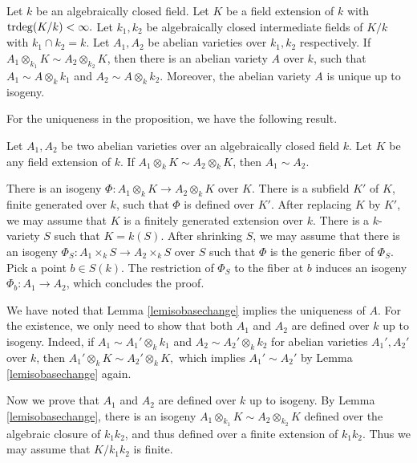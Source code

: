 \begin{pro}\label{lembasechangediagram}
Let $k$ be an algebraically closed field. Let $K$ be a field extension of $k$ with ${\mathrm{trdeg}}(K/k)<\infty.$
Let $k_1,k_2$ be algebraically closed intermediate fields of $K/k$ with $k_1\cap k_2=k.$
Let $A_1,A_2$ be abelian varieties over $k_1,k_2$ respectively.
 If $A_1\otimes_{k_1}K\sim A_2\otimes_{k_2}K$, then there is an abelian variety
$A$ over $k$, such that $A_1\sim A\otimes_{k}k_1$ and $A_2\sim A\otimes_{k}k_2.$
Moreover, the abelian variety $A$ is unique up to isogeny.
\end{pro}

For the uniqueness in the proposition, we have the following result.

\begin{lem}
\notready\label{lemisobasechange}
Let $A_1,A_2$ be two abelian varieties over an algebraically closed field $k$.  Let $K$ be any field extension of $k$. If $A_1\otimes_kK\sim A_2\otimes_kK$, then $A_1\sim A_2.$
\end{lem}

\proof
There is an isogeny  $\Phi: A_1\otimes_kK\to A_2\otimes_kK$ over $K.$ There is a subfield $K'$ of $K$, finite generated over $k$, such that $\Phi$ is defined over $K'$. After replacing $K$ by $K'$, we may assume that $K$ is a finitely generated extension over $k$.
There is a $k$-variety $S$ such that $K=k(S).$ After shrinking $S$, we may assume that there is an isogeny $\Phi_S: A_1\times_k S\to A_2\times_k S$ over $S$ such that $\Phi$ is the generic fiber of $\Phi_S.$ Pick a point $b\in S(k)$. The restriction of $\Phi_S$ to the fiber at $b$ induces an isogeny $\Phi_b: A_1\to A_2$, which concludes the proof.
\endproof


We have noted that Lemma \ref{lemisobasechange} implies the uniqueness of $A.$
For the existence, we only need to show that both $A_1$ and $A_2$ are defined over $k$ up to isogeny.
Indeed, if $A_1\sim A_1'\otimes_kk_1$ and  $A_2\sim A_2'\otimes_kk_2$ for abelian varieties $A_1',A_2'$ over $k$, then $A_1'\otimes_kK\sim A_2'\otimes_kK,$
which implies $A_1'\sim A_2'$ by Lemma \ref{lemisobasechange} again.

Now we prove that $A_1$ and $A_2$ are defined over $k$ up to isogeny.
By Lemma \ref{lemisobasechange}, there is an isogeny
$A_1\otimes_{k_1}K\sim A_2\otimes_{k_2}K$ defined over the algebraic closure of $k_1k_2$, and thus defined over a finite extension of $k_1k_2$.
Thus we may assume that $K/k_1k_2$ is finite.

